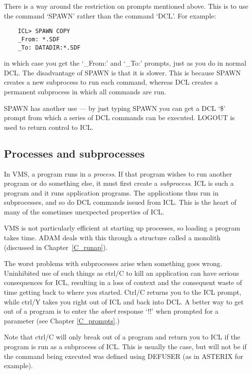 There is a way around the restriction on prompts mentioned above.
This is to use the command `SPAWN' rather than the command `DCL'.
For example:

\begin{small}
\begin{verbatim}
    ICL> SPAWN COPY
    _From: *.SDF
    _To: DATADIR:*.SDF
\end{verbatim}
\end{small}

in which case you get the `\_From:' and `\_To:' prompts, just as you do in
normal DCL.
The disadvantage of SPAWN is that it is slower.
This is because SPAWN creates a new subprocess to run each command, whereas
DCL creates a permanent subprocess in which all commands are run.

SPAWN has another use --- by just typing SPAWN you can get a DCL `\$' prompt
from which a series of DCL commands can be executed.
LOGOUT is used to return control to ICL.

\subsection{Processes and subprocesses}

In VMS, a program runs in a {\em process}.
If that program wishes to run another program or do something else, it must
first create a {\em subprocess}.
ICL is such a program and it runs application programs.
The applications thus run in subprocesses, and so do DCL commands issued from
ICL. 
This is the heart of many of the sometimes unexpected properties of ICL. 

VMS is not particularly efficient at starting up processes, so loading a
program takes time.
ADAM deals with this through a structure called a monolith (discussed in
Chapter~\ref{C_runap}).

The worst problems with subprocesses arise when something goes wrong. 
Uninhibited use of such things as ctrl/C to kill an application can have serious
consequences for ICL, resulting in a loss of context and the consequent waste
of time getting back to where you started.
Ctrl/C returns you to the ICL prompt, while ctrl/Y takes you right out of ICL
and back into DCL. 
A better way to get out of a program is to enter the {\em abort} response `!!'
when prompted for a parameter (see Chapter \ref{C_prompts}.)

Note that ctrl/C will only break out of a program and return you to ICL if the
program is run as a subprocess of ICL.
This is usually the case, but will not be if the command being executed was
defined using DEFUSER (as in ASTERIX for example).

